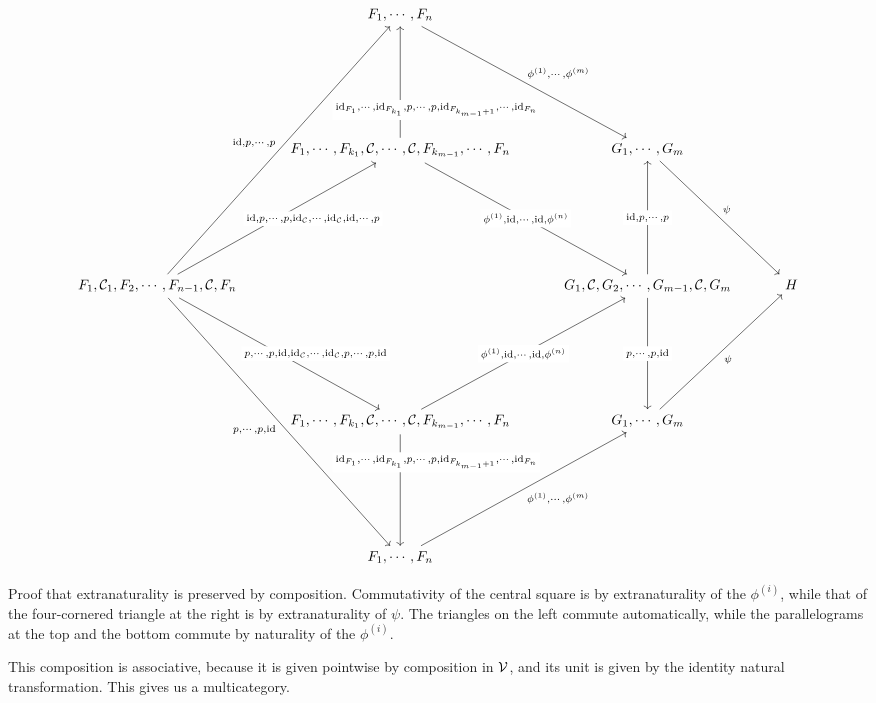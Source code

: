 \documentclass{report}[11pt]
\begin{document}
\begin{SidewaysFigure}
  \[
    \begin{tikzcd}[ampersand replacement=\&, row sep=80pt, column sep=30pt]
        \& F_1,\cdots,F_n \arrow[dr, "{\phi^{(1)},\cdots,\phi^{(m)}}"]
          \&
            \& \\
        \& F_1,\cdots,F_{k_1},\C,\cdots,\C,F_{k_{m-1}},\cdots,F_n \arrow[u, "{\id_{F_1},\cdots,\id_{F_{k_1}},p,\cdots,p,\id_{F_{k_{m-1}+1}},\cdots,\id_{F_n}}"' {description, near start, xshift=6ex}] \arrow[dr, "{\phi^{(1)},\id,\cdots,\id,\phi^{(n)}}" description]
          \& G_1,\cdots,G_m \arrow[dr, "\psi"]
            \& \\
      F_1,\C_1,F_2,\cdots,F_{n-1},\C,F_n \arrow[uur, "{\id,p,\cdots,p}"] \arrow[ddr, "{p,\cdots,p,\id}"'] \arrow[ur, "{\id,p,\cdots,p,\id_{\C},\cdots,\id_{\C},\id,\cdots,p}"' {description, xshift=6ex}] \arrow[dr, "{p,\cdots,p,\id,\id_{\C},\cdots,\id_{\C},p,\cdots,p,\id}" {description, xshift=6ex}]
        \&
          \& G_1,\C,G_2,\cdots,G_{m-1},\C,G_m \arrow[u, "{\id,p,\cdots,p}" description] \arrow[d, "{p,\cdots,p,\id}" description]
            \& H \\
        \& F_1,\cdots,F_{k_1},\C,\cdots,\C,F_{k_{m-1}},\cdots,F_n \arrow[d, "{\id_{F_1},\cdots,\id_{F_{k_1}},p,\cdots,p,\id_{F_{k_{m-1}+1}},\cdots,\id_{F_n}}"' {description, near start, xshift=6ex}] \arrow[ur, "{\phi^{(1)},\id,\cdots,\id,\phi^{(n)}}" description]
          \& G_1,\cdots,G_m \arrow[ur, "\psi"']
            \& \\
        \& F_1,\cdots,F_n \arrow[ur, "{\phi^{(1)},\cdots,\phi^{(m)}}"']
          \&
            \&
    \end{tikzcd}
    \]
  \caption{Proof that extranaturality is preserved by composition.  
  Commutativity of the central square is by extranaturality of the $\phi^{(i)}$, while that of the four-cornered triangle at the right is by extranaturality of $\psi$.  
  The triangles on the left commute automatically, while the parallelograms at the top and the bottom commute by naturality of the $\phi^{(i)}$.}
  \label{FigExtranaturalityComposition}
\end{SidewaysFigure}

This composition is associative, because it is given pointwise by composition in ${\mathcal{V}}$, and its unit is given by the identity natural transformation.  
This gives us a multicategory.  
\end{document}
